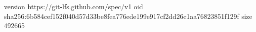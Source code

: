 version https://git-lfs.github.com/spec/v1
oid sha256:6b584cef152f040d57d33be8fea776ede199e917cf2dd26c1aa76823851f129f
size 492665
